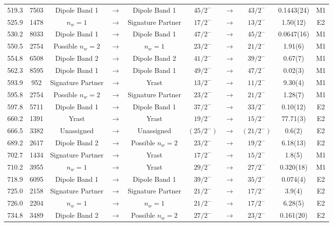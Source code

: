 \begin{landscape}
\begin{center}
\begin{longtable}{|c|c|ccc|ccc|c|c|}
 519.3&7503&Dipole Band 1&$ \rightarrow $&Dipole Band 1&$ 45/2^{-} $&$ \rightarrow $&$ 43/2^{-} $& 0.1443(24)& M1 \\
 525.9&1478&$n_w=1$&$ \rightarrow $&Signature Partner&$ 17/2^{-} $&$ \rightarrow $&$ 13/2^{-} $& 1.50(12)& E2 \\
 530.2&8033&Dipole Band 1&$ \rightarrow $&Dipole Band 1&$ 47/2^{-} $&$ \rightarrow $&$ 45/2^{-} $& 0.0647(16)& M1 \\
 550.5&2754&Possible $n_w=2$&$ \rightarrow $&$n_w=1$&$ 23/2^{-} $&$ \rightarrow $&$ 21/2^{-} $& 1.91(6)& M1 \\
 554.8&6508&Dipole Band 2&$ \rightarrow $&Dipole Band 2&$ 41/2^{-} $&$ \rightarrow $&$ 39/2^{-} $& 0.67(7)& M1 \\
 562.3&8595&Dipole Band 1&$ \rightarrow $&Dipole Band 1&$ 49/2^{-} $&$ \rightarrow $&$ 47/2^{-} $& 0.02(3)& M1 \\
 593.9&952&Signature Partner&$ \rightarrow $&Yrast&$ 13/2^{-} $&$ \rightarrow $&$ 11/2^{-} $& 9.30(4)& M1 \\
 595.8&2754&Possible $n_w=2$&$ \rightarrow $&Signature Partner&$ 23/2^{-} $&$ \rightarrow $&$ 21/2^{-} $& 1.28(7)& M1 \\
 597.8&5711&Dipole Band 1&$ \rightarrow $&Dipole Band 1&$ 37/2^{-} $&$ \rightarrow $&$ 33/2^{-} $& 0.10(12)& E2 \\
 660.2&1391&Yrast&$ \rightarrow $&Yrast&$ 19/2^{-} $&$ \rightarrow $&$ 15/2^{-} $& 77.71(3)& E2 \\
 666.5&3382&Unassigned&$ \rightarrow $&Unassigned&$ (25/2^{-}) $&$ \rightarrow $&$ (21/2^{-}) $& 0.6(2)& E2 \\
 689.2&2617&Dipole Band 2&$ \rightarrow $&Possible $n_w=2$&$ 23/2^{-} $&$ \rightarrow $&$ 19/2^{-} $& 6.18(13)& E2 \\
 702.7&1434&Signature Partner&$ \rightarrow $&Yrast&$ 17/2^{-} $&$ \rightarrow $&$ 15/2^{-} $& 1.8(5)& M1 \\
 710.2&3955&$n_w=1$&$ \rightarrow $&Yrast&$ 29/2^{-} $&$ \rightarrow $&$ 27/2^{-} $& 0.320(18)& M1 \\
 718.9&6095&Dipole Band 1&$ \rightarrow $&Dipole Band 1&$ 39/2^{-} $&$ \rightarrow $&$ 35/2^{-} $& 0.074(4)& E2 \\
 725.0&2158&Signature Partner&$ \rightarrow $&Signature Partner&$ 21/2^{-} $&$ \rightarrow $&$ 17/2^{-} $& 3.9(4)& E2 \\
 726.0&2204&$n_w=1$&$ \rightarrow $&$n_w=1$&$ 21/2^{-} $&$ \rightarrow $&$ 17/2^{-} $& 6.28(5)& E2 \\
 734.8&3489&Dipole Band 2&$ \rightarrow $&Possible $n_w=2$&$ 27/2^{-} $&$ \rightarrow $&$ 23/2^{-} $& 0.161(20)& E2 \\

\end{longtable}
\end{center}
\end{landscape}
